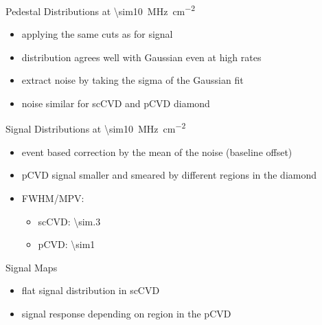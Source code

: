 \begin{frame}{Pedestal Distributions at \SI{\sim10}{\mega\hertz\per\centi\meter^2}}
 
	\vspace*{-15pt}\vspace*{-10pt}

	\begin{itemize} \itemfill
		\item applying the same cuts as for signal
		\item distribution agrees well with Gaussian even at high rates
		\item extract noise by taking the sigma of the Gaussian fit
		\item noise similar for scCVD and pCVD diamond
	\end{itemize}
 
\end{frame}
\begin{frame}{Signal Distributions at \SI{\sim10}{\mega\hertz\per\centi\meter^2}}
 
	\vspace*{-15pt}\vspace*{-10pt}

	\begin{itemize} \itemfill
		\item event based correction by the mean of the noise (baseline offset)
		\item pCVD signal smaller and smeared by different regions in the diamond
		\item FWHM/MPV:
		\begin{itemize}\vspace*{3pt}
			\item scCVD: \SI{\sim.3}{}
			\item pCVD: \SI{\sim1}{}
		\end{itemize}

	\end{itemize}
 
\end{frame}
\begin{frame}{Signal Maps}
 
	\begin{figure}\vspace*{-15pt}
		\centering
	\end{figure}
	
	\begin{itemize} \itemfill
		\item flat signal distribution in scCVD
		\item signal response depending on region in the pCVD
	\end{itemize}
 
\end{frame}

